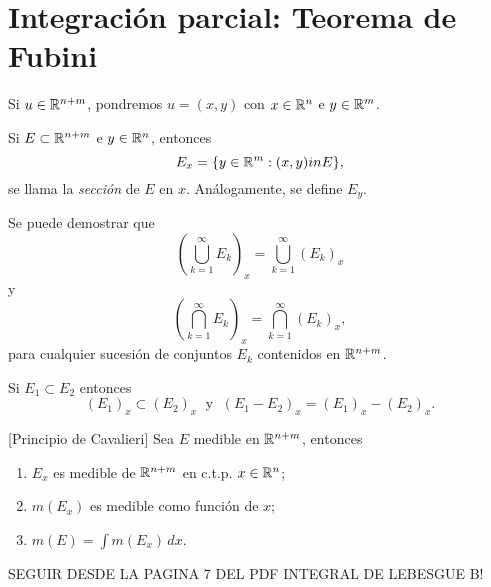                             \section{Integraci\'on parcial: Teorema de Fubini}
                            
        Si $u \in \mathbb{R}^{n+m}$, pondremos $u=(x,y)$
        con $x \in \mathbb{R}^n$ e $y \in \mathbb{R}^m$. 
        
        Si $E\subset \mathbb{R}^{n+m}$ e $y\in \mathbb{R}^n$, entonces
        \[
        E_x=\{y \in \mathbb{R}^m: (x,y)in E\},
        \]
        se llama la \emph{secci\'on} de $E$ en $x$.
                An\'alogamente, se define $E_y$.
        
        Se puede demostrar que 
        \[
        \left(\bigcup\limits_{k=1}^{\infty} E_k \right)_x
        = \bigcup\limits_{k=1}^{\infty} \left(E_k\right)_x\]
        y
        \[
        \left(\bigcap\limits_{k=1}^{\infty} E_k \right)_x
        = \bigcap\limits_{k=1}^{\infty} \left(E_k\right)_x,\]
        para cualquier sucesi\'on de conjuntos $E_k$ contenidos en $\mathbb{R}^{n+m}$. 
        
        Si $E_1\subset E_2$ entonces 
        \[
        \left(E_1\right)_x  \subset   \left(E_2\right)_x   
       \; \mbox{ y }\;
        \left(E_1-E_2\right)_x=\left(E_1\right)_x -\left(E_2\right)_x.
        \]
        
        \begin{teorema}{}[Principio de Cavalieri]
        Sea $E$ medible en $\mathbb{R}^{n+m}$, entonces
        \begin{enumerate}
            \item $E_x$ es medible de $\mathbb{R}^{n+m}$ en c.t.p. $x \in \mathbb{R}^n$;
            \item $m\left(E_x\right)$ es medible como funci\'on de $x$;
            \item $m(E)=\int m\left(E_x\right)\, dx$.
        \end{enumerate}
        \end{teorema}
        
        \begin{demo}
        SEGUIR DESDE LA PAGINA 7 DEL PDF INTEGRAL DE LEBESGUE B!
                
        \end{demo}
